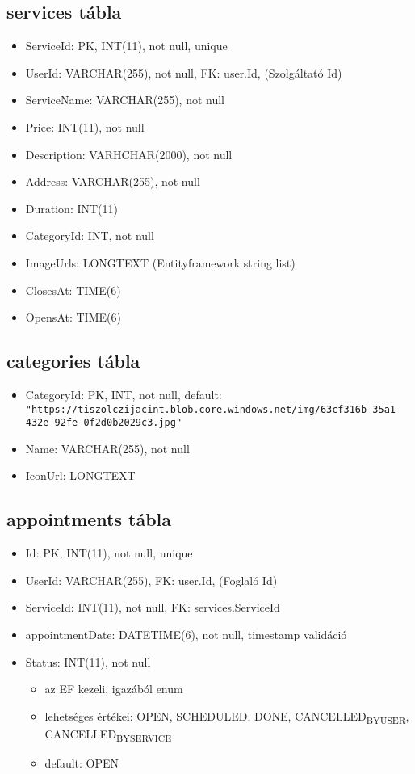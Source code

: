 \documentclass[11pt]{article}
\begin{document}
\subsection{services tábla}
\label{sec:org64fb5df}
\begin{itemize}
\item ServiceId: PK, INT(11), not null, unique
\item UserId: VARCHAR(255), not null, FK: user.Id, (Szolgáltató Id)
\item ServiceName: VARCHAR(255), not null
\item Price: INT(11), not null
\item Description: VARHCHAR(2000), not null
\item Address: VARCHAR(255), not null
\item Duration: INT(11)
\item CategoryId: INT, not null
\item ImageUrls: LONGTEXT (Entityframework string list)
\item ClosesAt: TIME(6)
\item OpensAt: TIME(6)
\end{itemize}
\subsection{categories tábla}
\label{sec:org822976e}
\begin{itemize}
\item CategoryId: PK, INT, not null,
default: \texttt{"https://tiszolczijacint.blob.core.windows.net/img/63cf316b-35a1-432e-92fe-0f2d0b2029c3.jpg"}
\item Name: VARCHAR(255), not null
\item IconUrl: LONGTEXT
\end{itemize}
\subsection{appointments tábla}
\label{sec:org122fb32}
\begin{itemize}
\item Id:  PK, INT(11), not null, unique
\item UserId: VARCHAR(255), FK: user.Id, (Foglaló Id)
\item ServiceId: INT(11), not null, FK: services.ServiceId
\item appointmentDate: DATETIME(6), not null, timestamp validáció
\item Status: INT(11), not null
\begin{itemize}
\item az EF kezeli, igazából enum
\item lehetséges értékei: OPEN, SCHEDULED, DONE, CANCELLED\textsubscript{BY}\textsubscript{USER}, CANCELLED\textsubscript{BY}\textsubscript{SERVICE}
\item default: OPEN
\end{itemize}
\end{itemize}
\end{document}
